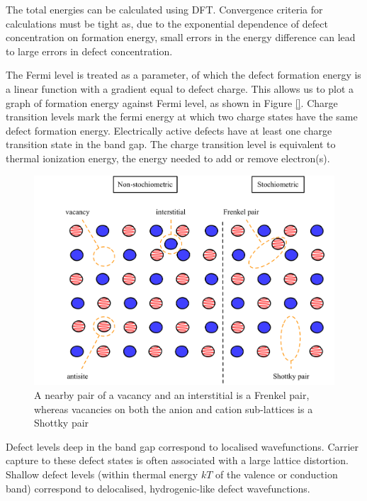 The total energies can be calculated using DFT. Convergence criteria for calculations must be tight as, due to the exponential dependence of defect concentration on formation energy, small errors in the energy difference can lead to large errors in defect concentration.

The Fermi level is treated as a parameter, of which the defect formation energy is a linear function with a gradient equal to defect charge. This allows us to plot a graph of formation energy against Fermi level, as shown in Figure \ref{}. Charge transition levels mark the fermi energy at which two charge states have the same defect formation energy. Electrically active defects have at least one charge transition state in the band gap. 
The charge transition level is equivalent to thermal ionization energy, the energy needed to add or remove electron(s). %

\begin{figure}[h]
\centering
  \includegraphics[width=1.0\columnwidth]{figures/ch3/classification.png}
  \caption[Classification of crystal point-defects]{A nearby pair of a vacancy and an interstitial is a Frenkel pair, whereas vacancies on both the anion and cation sub-lattices is a Shottky pair}
  \label{classification}
\end{figure}

Defect levels deep in the band gap correspond to localised wavefunctions. Carrier capture to these defect states is often associated with a large lattice distortion. Shallow defect levels (within thermal energy $kT$ of the valence or conduction band) correspond to delocalised, hydrogenic-like defect wavefunctions. 


